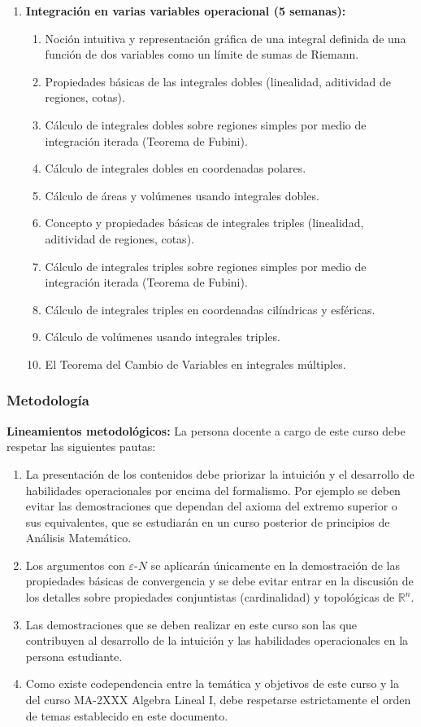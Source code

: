 \begin{refsection}
\begin{enumerate}
\item \textbf{Integración en varias variables operacional (5 semanas):}
\begin{enumerate}
    \item Noción intuitiva y representación gráfica de una integral definida de una función de dos variables como un límite de sumas de Riemann. 
    \item Propiedades básicas de las integrales dobles (linealidad, aditividad de regiones, cotas).
    \item Cálculo de integrales dobles sobre regiones simples  por medio de integración iterada (Teorema de Fubini).
    \item Cálculo de integrales dobles en coordenadas polares.
    \item Cálculo de áreas y volúmenes usando integrales dobles.
    \item Concepto y propiedades básicas de integrales triples (linealidad, aditividad de regiones, cotas).
    \item Cálculo de integrales triples sobre regiones simples  por medio de integración iterada (Teorema de Fubini).
    \item Cálculo de integrales triples en coordenadas cilíndricas y esféricas.
    \item Cálculo de volúmenes usando integrales triples.
    \item El Teorema del Cambio de Variables en integrales múltiples.
\end{enumerate}


\end{enumerate}

\subsubsection*{Metodología}

\noindent \textbf{Lineamientos metodológicos:} La persona docente a cargo de este curso debe respetar las siguientes pautas:
\begin{enumerate}
    \item La presentación de los contenidos debe priorizar la intuición y el desarrollo de habilidades operacionales por encima del formalismo. Por ejemplo se deben evitar las demostraciones que dependan del axioma del extremo superior o sus equivalentes, que se estudiarán en un curso posterior de principios de Análisis Matemático.
    \item Los argumentos con $\varepsilon$-$N$ se aplicarán únicamente en la demostración de las propiedades básicas de convergencia y se debe evitar entrar en la discusión de los detalles sobre propiedades conjuntistas (cardinalidad) y topológicas de $\mathbb{R}^n$.
    \item Las demostraciones que se deben realizar en este curso son las que contribuyen al desarrollo de la intuición y las habilidades operacionales en la persona estudiante.
    \item Como existe codependencia entre la temática y objetivos de este curso y la del curso MA-2XXX Algebra Lineal I, debe respetarse estrictamente el orden de temas establecido en este documento.
\end{enumerate}


\end{refsection}
